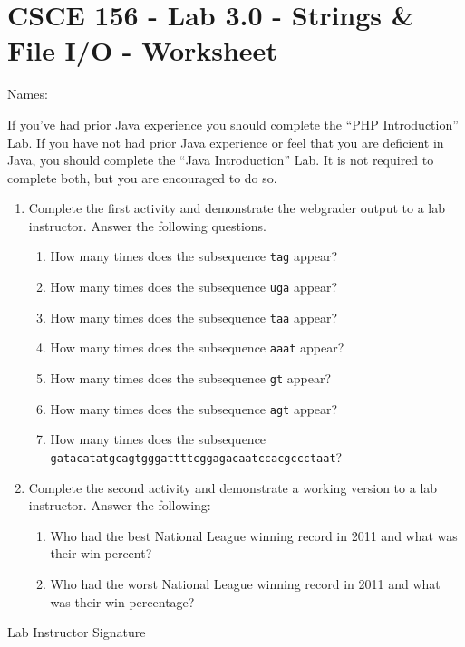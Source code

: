 \documentclass[12pt]{scrartcl}
\begin{document}
\section*{CSCE 156 - Lab 3.0 - Strings \& File I/O - Worksheet}

Names: \underline{\hspace{10cm}}

If you've had prior Java experience you should complete the 
``PHP Introduction'' Lab.  If you have not had prior Java 
experience or feel that you are deficient in Java, you should 
complete the ``Java Introduction'' Lab.  It is not required to 
complete both, but you are encouraged to do so.

\begin{enumerate}
  \item Complete the first activity and demonstrate the webgrader 
  output to a lab instructor.  Answer the following questions.
  \begin{enumerate}
    \item How many times does the subsequence \texttt{tag} appear?
    \item How many times does the subsequence \texttt{uga} appear?
    \item How many times does the subsequence \texttt{taa} appear?
    \item How many times does the subsequence \texttt{aaat} appear?
    \item How many times does the subsequence \texttt{gt} appear?
    \item How many times does the subsequence \texttt{agt} appear?
    \item How many times does the subsequence \\
    \texttt{gatacatatgcagtgggattttcggagacaatccacgccctaat}?
  \end{enumerate}
  \item Complete the second activity and demonstrate a working version 
  to a lab instructor.  Answer the following:
  \begin{enumerate}
    \item Who had the best National League winning record in 2011 
    and what was their win percent?
    \item Who had the worst National League winning record in 2011 and what was their win percentage?
  \end{enumerate}
\end{enumerate}

Lab Instructor Signature\underline{\hspace{7.5cm}}
\end{document}
